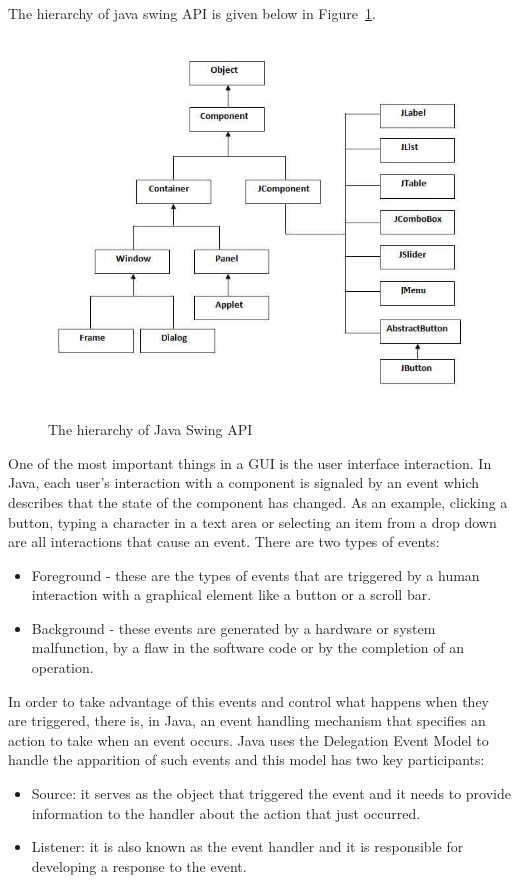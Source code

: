 \documentclass[12pt,a4paper]{report}
\begin{document}
The hierarchy of java swing API is given below in Figure~\ref{fig:swing}.
\begin{figure}[!ht]
	\centering
	\includegraphics[width=12cm,height=10cm]{pics/swing.jpg}
	\caption{The hierarchy of Java Swing API\protect\footnotemark}
	\label{fig:swing}
\end{figure}
\newpage
One of the most important things in a GUI is the user interface interaction. In Java, each user's interaction with a component is signaled by an event which describes that the state of the component has changed. As an example, clicking a button, typing a character in a text area or selecting an item from a drop down are all interactions that cause an event. There are two types of events:
\begin{itemize}
	\item Foreground - these are the types of events that are triggered by a human interaction with a graphical element like a button or a scroll bar. 
	\item Background - these events are generated by a hardware or system malfunction, by a flaw in the software code or by the completion of an operation.
\end{itemize}
In order to take advantage of this events and control what happens when they are triggered, there is, in Java, an event handling mechanism that specifies an action to take when an event occurs. Java uses the Delegation Event Model to handle the apparition of such events and this model has two key participants:
\begin{itemize}
	\item Source: it serves as the object that triggered the event and it needs to provide information to the handler about the action that just occurred.  
	\item Listener: it is also known as the event handler and it is responsible for developing a response to the event. 
\end{itemize}
\end{document}
